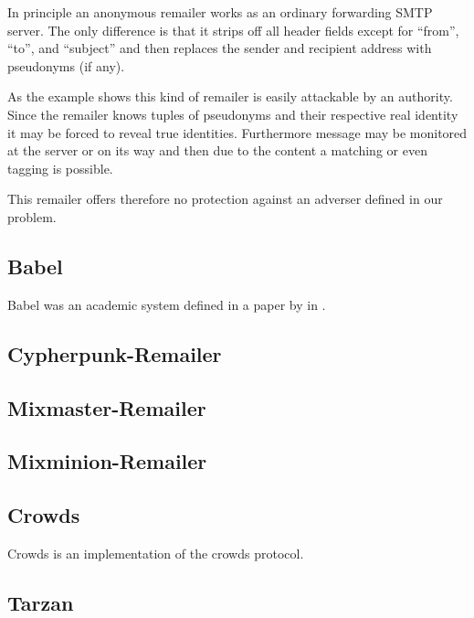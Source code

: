 In principle an anonymous remailer works as an ordinary forwarding SMTP server. The only difference is that it strips off all header fields except for ``from'', ``to'', and ``subject'' and then replaces the sender and recipient address with pseudonyms (if any). 

As the example shows this kind of remailer is easily attackable by an authority. Since the remailer knows tuples of pseudonyms and their respective real identity it may be forced to reveal true identities. Furthermore message may be monitored at the server or on its way and then due to the content a matching or even tagging is possible.

This remailer offers therefore no protection against an adverser defined in our problem.

\subsection{Babel}
Babel was an academic system defined in a paper by \citeauthor{babel} in \citeyear{babel}\cite{babel}.


\subsection{Cypherpunk-Remailer\label{sec:remCypherpunk}}

\subsection{Mixmaster-Remailer\label{sec:remMixmaster}}

\subsection{Mixminion-Remailer\label{sec:remMixminion}}

\subsection{Crowds}
Crowds is an implementation of the crowds protocol.


\subsection{Tarzan}

